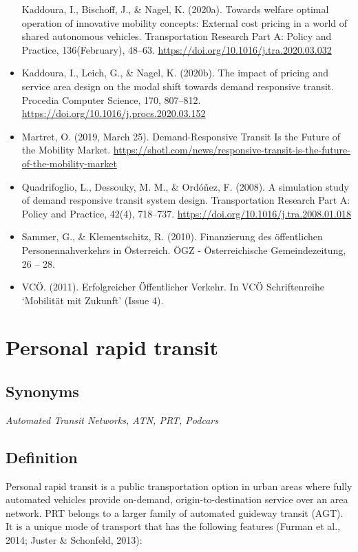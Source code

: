 \documentclass[
]{book}
\begin{document}
\begin{itemize}
  Kaddoura, I., Bischoff, J., \& Nagel, K. (2020a). Towards welfare optimal operation of innovative mobility concepts: External cost pricing in a world of shared autonomous vehicles. Transportation Research Part A: Policy and Practice, 136(February), 48--63. \url{https://doi.org/10.1016/j.tra.2020.03.032}
\item
  Kaddoura, I., Leich, G., \& Nagel, K. (2020b). The impact of pricing and service area design on the modal shift towards demand responsive transit. Procedia Computer Science, 170, 807--812. \url{https://doi.org/10.1016/j.procs.2020.03.152}
\item
  Martret, O. (2019, March 25). Demand-Responsive Transit Is the Future of the Mobility Market. \url{https://shotl.com/news/responsive-transit-is-the-future-of-the-mobility-market}
\item
  Quadrifoglio, L., Dessouky, M. M., \& Ordóñez, F. (2008). A simulation study of demand responsive transit system design. Transportation Research Part A: Policy and Practice, 42(4), 718--737. \url{https://doi.org/10.1016/j.tra.2008.01.018}
\item
  Sammer, G., \& Klementschitz, R. (2010). Finanzierung des öffentlichen Personennahverkehrs in Österreich. ÖGZ - Österreichische Gemeindezeitung, 26 -- 28.
\item
  VCÖ. (2011). Erfolgreicher Öffentlicher Verkehr. In VCÖ Schriftenreihe `Mobilität mit Zukunft' (Issue 4).
\end{itemize}

\hypertarget{prt}{%
\section{Personal rapid transit}\label{prt}}

\hypertarget{synonyms-25}{%
\subsection*{Synonyms}\label{synonyms-25}}

\emph{Automated Transit Networks, ATN, PRT, Podcars}

\hypertarget{definition-29}{%
\subsection*{Definition}\label{definition-29}}

Personal rapid transit is a public transportation option in urban areas where fully automated vehicles provide on-demand, origin-to-destination service over an area network. PRT belongs to a larger family of automated guideway transit (AGT). It is a unique mode of transport that has the following features (Furman et al., 2014; Juster \& Schonfeld, 2013):
\end{document}
